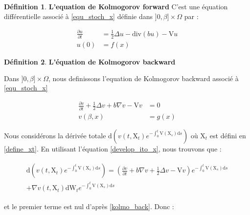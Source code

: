 \documentclass[11pt]{article}
\theoremstyle{definition}
\newtheorem{definition}{Définition}[section]
\theoremstyle{remark}
\begin{document}
\begin{definition}{\textbf{L'equation de Kolmogorov forward}}
C'est une équation différentielle associé à \eqref{equ_stoch_x} définie  dans $]0,\beta] \times \Omega$ par : 

\begin{equation}
\label{kolmo_forw}
\begin{split}
\frac{\partial u}{\partial t} &= \frac{1}{2} \Delta u - \mathrm{div}(bu) - \mathrm{V}u \\
u(0) &= f(x)
\end{split}
\end{equation}

\end{definition}



\begin{definition}{\textbf{L'équation de Kolmogorov backward}}

Dans $]0,\beta] \times \Omega$, nous definissons l'equation de Kolmogorov backward associé à \eqref{equ_stoch_x}

\begin{equation}
\label{kolmo_back}
\begin{split}
\frac{\partial v}{\partial t} + \frac{1}{2} \Delta v + b \nabla v - \mathrm{V}v &= 0 \\
v(\beta, x) &= g(x)
\end{split}
\end{equation}
\end{definition}

Nous considérons la dérivée totale $\mathrm{d}(v(t, \mathrm{X}_{t}) e^{-\int_0^{t} \mathrm{V}(\mathrm{X}_{s}) \mathrm{d}s})$ où $\mathrm{X}_{t}$ est défini en \eqref{define_xt}. En utilisant l'équation \eqref{develop_ito_x}, nous trouvons que :

\begin{multline}
\begin{split}
\mathrm{d}(v(t, \mathrm{X}_{t}) e^{-\int_0^{t} \mathrm{V}(\mathrm{X}_{s}) \mathrm{d}s}) = (\frac{\partial v}{\partial t} + b \nabla v + \frac{1}{2}\Delta v - \mathrm{V}v)e^{-\int_0^{t} \mathrm{V}(\mathrm{X}_{s}) \mathrm{d}s} \\
+ \nabla v(t, \mathrm{X}_t)\mathrm{dW}_{t} e^{-\int_0^{t} \mathrm{V}(\mathrm{X}_{s}) \mathrm{d}s}
\end{split}
\end{multline}

et le premier terme est nul d'après \eqref{kolmo_back}. Donc :
\end{document}

